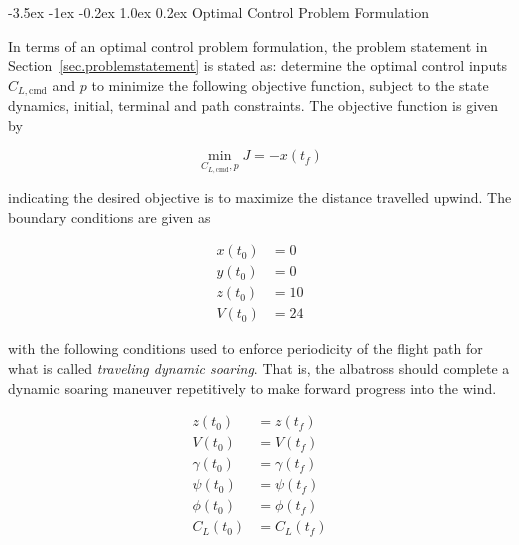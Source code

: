 \documentclass[11pt,letterpaper,onecolumn]{article}
\makeatletter
\renewcommand\section{\@startsection{section}{1}{\z@}%
{-3.5ex \@plus-1ex \@minus-0.2ex}%
{1.0ex \@plus0.2ex}%
{\fontsize{12pt}{12pt}\selectfont\bfseries\sffamily}}
\renewcommand\subsection{\@startsection{subsection}{1}{\z@}%
{-3.5ex \@plus-1ex \@minus-0.2ex}%
{0.5ex \@plus0.2ex}%
{\fontsize{10pt}{10pt}\selectfont\bfseries\sffamily}}
\makeatother
\begin{document}

  \section{Optimal Control Problem Formulation}\label{sec.optimalproblem}

  In terms of an optimal control problem formulation, the problem statement in Section~\ref{sec.problemstatement} is stated as: determine the optimal control inputs $C_{L,\text{cmd}}$ and $p$ to minimize the following objective function, subject to the state dynamics, initial, terminal and path constraints.
  The objective function is given by

  \begin{equation*}
    \min_{C_{L,\text{cmd}},p}J=-x(t_{f})
  \end{equation*}

  indicating the desired objective is to maximize the distance travelled upwind.
  The boundary conditions are given as

  \begin{equation*}
    \begin{split}
      x(t_{0})  &= 0 \\
      y(t_{0})  &= 0 \\
      z(t_{0})  &= 10 \\
      V(t_{0})  &= 24
    \end{split}
  \end{equation*}

  with the following conditions used to enforce periodicity of the flight path for what is called \textit{traveling dynamic soaring}.
  That is, the albatross should complete a dynamic soaring maneuver repetitively to make forward progress into the wind.

  \begin{equation*}
    \begin{split}
      z(t_{0})      &= z(t_{f}) \\
      V(t_{0})      &= V(t_{f}) \\
      \gamma(t_{0}) &= \gamma(t_{f}) \\
      \psi(t_{0})   &= \psi(t_{f}) \\
      \phi(t_{0})   &= \phi(t_{f}) \\
      C_{L}(t_{0})  &= C_{L}(t_{f})
    \end{split}
  \end{equation*}
\end{document}
